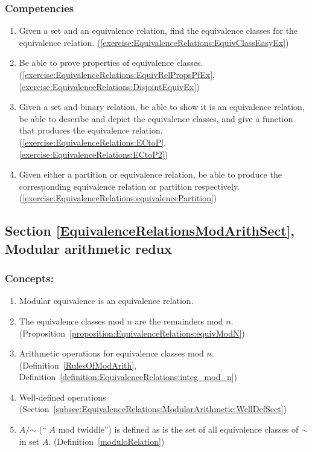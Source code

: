 \subsubsection*{Competencies}
\begin{enumerate}
\item
Given a set and an equivalence relation, find the equivalence classes for the equivalence relation.  (\ref{exercise:EquivalenceRelations:EquivClassEasyEx})
\item
Be able to prove properties of equivalence classes. (\ref{exercise:EquivalenceRelations:EquivRelPropsPfEx}, \ref{exercise:EquivalenceRelations:DisjointEquivEx})
\item
Given a set and binary relation, be able to show it is an equivalence relation,  be able to describe and depict the equivalence classes, and give a function that produces the equivalence relation. (\ref{exercise:EquivalenceRelations:ECtoP}, \ref{exercise:EquivalenceRelations:ECtoP2})
\item
Given either a partition or equivalence relation, be able to produce the corresponding equivalence relation or partition respectively. (\ref{exercise:EquivalenceRelations:equivalencePartition})
\end{enumerate}


\subsection*{Section \ref{EquivalenceRelationsModArithSect}, Modular arithmetic redux}
\subsubsection*{Concepts:}
\begin{enumerate}
\item 
Modular equivalence is an equivalence relation.
\item
The equivalence classes  mod $n$ are the remainders mod $n$.  (Proposition~\ref{proposition:EquivalenceRelations:equivModN})
\item
Arithmetic operations for equivalence classes mod $n$. (Definition~\ref{RulesOfModArith}, Definition~\ref{definition:EquivalenceRelations:integ_mod_n})
\item
Well-defined operations (Section~\ref{subsec:EquivalenceRelations:ModularArithmetic:WellDefSect})
\item
$A/\mathord{\sim}$ (`` $A$ mod twiddle'') is defined as is the set of all equivalence classes of $\sim$ in set $A$.  (Definition~\ref{moduloRelation})
\end{enumerate}

